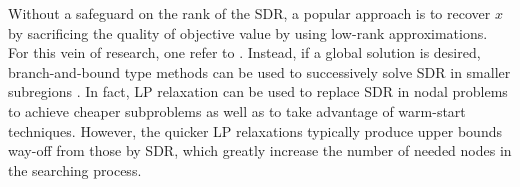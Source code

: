 \documentclass[../main]{subfiles}
\begin{document}
Without a safeguard on the rank of the SDR, a popular approach is to recover \(x\) by sacrificing the quality of objective value by using low-rank approximations. For this vein of research, one refer to \cite[]{so_unified_2008,}. Instead, if a global solution is desired, branch-and-bound type methods can be used to successively solve SDR in smaller subregions \cite[]{audet_branch_2000,vandenbussche_branch-and-cut_2005}. In fact, LP relaxation can be used to replace SDR in nodal problems to achieve cheaper subproblems as well as to take advantage of warm-start techniques. However, the quicker LP relaxations typically produce upper bounds way-off from those by SDR, which greatly increase the number of needed nodes in the searching process.
\end{document}
